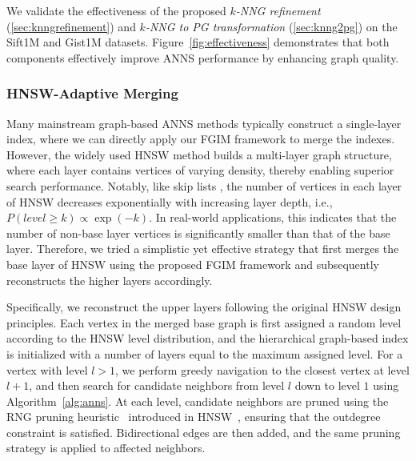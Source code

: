 \documentclass[acmsmall]{acmart}
\theoremstyle{remark}
\theoremstyle{definition}
\begin{document}
We validate the effectiveness of the proposed \textit{$k$-NNG refinement} (\textsection\ref{sec:knngrefinement}) and \textit{$k$-NNG to PG transformation} (\textsection\ref{sec:knng2pg}) on the Sift1M and Gist1M datasets. Figure~\ref{fig:effectiveness} demonstrates that both components effectively improve ANNS performance by enhancing graph quality.



\subsubsection{HNSW-Adaptive Merging}

Many mainstream graph-based ANNS methods typically construct a single-layer index, where we can directly apply our FGIM framework to merge the indexes. However, the widely used HNSW \cite{malkov2018efficient} method builds a multi-layer graph structure, where each layer contains vertices of varying density, thereby enabling superior search performance. Notably, like skip lists \cite{pugh1990skip}, the number of vertices in each layer of HNSW decreases exponentially with increasing layer depth, i.e., $P(level \ge k) \propto \exp(-k)$. In real-world applications, this indicates that the number of non-base layer vertices is significantly smaller than that of the base layer. Therefore, we tried a simplistic yet effective strategy that first merges the base layer of HNSW using the proposed FGIM framework and subsequently reconstructs the higher layers accordingly.

Specifically, we reconstruct the upper layers following the original HNSW design principles. Each vertex in the merged base graph is first assigned a random level according to the HNSW level distribution, and the hierarchical graph-based index is initialized with a number of layers equal to the maximum assigned level. For a vertex with level $l>1$, we perform greedy navigation to the closest vertex at level $l+1$, and then search for candidate neighbors from level $l$ down to level $1$ using Algorithm~\ref{alg:anns}. At each level, candidate neighbors are pruned using the RNG pruning heuristic~\cite{toussaint1980relative} introduced in HNSW~\cite{malkov2018efficient}, ensuring that the outdegree constraint is satisfied. Bidirectional edges are then added, and the same pruning strategy is applied to affected neighbors.
\end{document}
